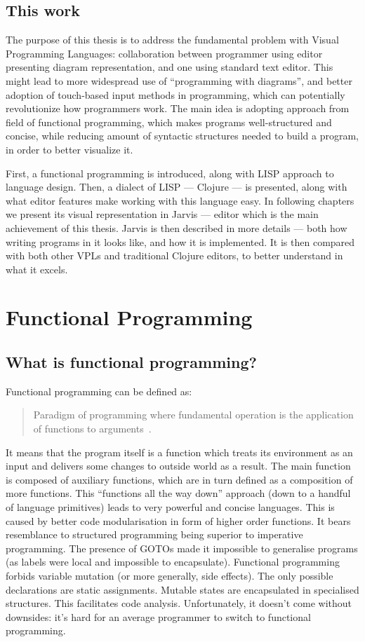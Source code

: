 \documentclass[11pt]{scrartcl}
\begin{document}
\subsection{This work}
The purpose of this thesis is to address the fundamental problem with Visual
Programming Languages: collaboration between programmer using editor presenting
diagram representation, and one using standard text editor. This might lead to
more widespread use of ``programming with diagrams'', and better adoption of
touch-based input methods in programming, which can potentially revolutionize
how programmers work.
The main idea is adopting approach from field of functional programming, which
makes programs well-structured and concise, while reducing amount of syntactic
structures needed to build a program, in order to better visualize it.

First, a functional programming is introduced, along with LISP approach to
language design. Then, a dialect of LISP --- Clojure --- is presented, along
with what editor features make working with this language easy.
In  following chapters we present its
visual representation in Jarvis --- editor which is the main achievement
of this thesis. Jarvis is then described in more details --- both how writing
programs in it looks like, and how it is implemented.
It is then compared with both other VPLs and traditional
Clojure editors, to better understand in what it excels.


\section{Functional Programming}
\subsection{What is functional programming?}
Functional programming can be defined as:
\blockquote{Paradigm of programming where
  fundamental operation is the application of functions to
  arguments~\cite{Hughes:1989:WFP:63410.63411}.}

It means that the program itself is a function which treats its environment as
an input and delivers some changes to outside world as a result.
The main function is composed of auxiliary functions, which are in turn defined
as a composition of more functions.
This ``functions all the way down'' approach (down to a handful of language
primitives) leads to very powerful and concise languages.
This is caused by better code modularisation in form of higher order functions.
It bears resemblance to structured programming being superior to imperative
programming.
The presence of GOTOs made it impossible to generalise programs (as labels were
local and impossible to encapsulate).
Functional programming forbids variable mutation (or more generally, side
effects).
The only possible declarations are static assignments.
Mutable states are encapsulated in specialised structures.
This facilitates code analysis.
Unfortunately, it doesn't come without downsides: it’s hard for an average
programmer to switch to functional programming.
\end{document}
